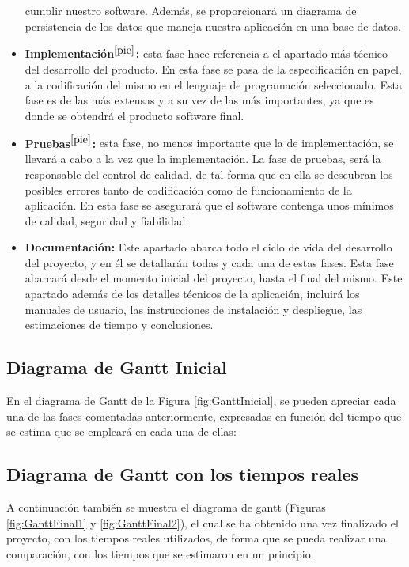 \begin{itemize}
           cumplir nuestro software. Además, se proporcionará un diagrama de
           persistencia de los datos que maneja nuestra aplicación en una base
           de datos.
    \item \textbf{Implementación$^{\ref{pie}}$: } esta fase hace referencia a
           el apartado más técnico del desarrollo del producto. En esta fase se
           pasa de la especificación en papel, a la codificación del mismo en el
           lenguaje de programación seleccionado. Esta fase es de las más
           extensas y a su vez de las más importantes, ya que es donde se
           obtendrá el producto software final.
    \item \textbf{Pruebas$^{\ref{pie}}$: } esta fase, no menos importante que
           la de implementación, se llevará a cabo a la vez que la
           implementación. La fase de pruebas, será la responsable del control
           de calidad, de tal forma que en ella se descubran los posibles
           errores tanto de codificación como de funcionamiento de la aplicación.
           En esta fase se asegurará que el software contenga unos mínimos de
           calidad, seguridad y fiabilidad.
    \item \textbf{Documentación: } Este apartado abarca todo el ciclo de vida
           del desarrollo del proyecto, y en él se detallarán todas y cada una
           de estas fases. Esta fase abarcará desde el momento inicial del
           proyecto, hasta el final del mismo. Este apartado además de los
           detalles técnicos de la aplicación, incluirá los manuales de usuario,
           las instrucciones de instalación y despliegue, las estimaciones de
           tiempo y conclusiones.
\end{itemize}

\subsection{Diagrama de Gantt Inicial}

En el diagrama de Gantt de la Figura \ref{fig:GanttInicial}, se pueden
apreciar cada una de las fases comentadas anteriormente, expresadas en función
del tiempo que se estima que se empleará en cada una de ellas:

\subsection{Diagrama de Gantt con los tiempos reales}

A continuación también se muestra el diagrama de gantt (Figuras
\ref{fig:GanttFinal1} y \ref{fig:GanttFinal2}), el cual se ha obtenido una vez
finalizado el proyecto, con los tiempos reales utilizados, de forma que se pueda
realizar una comparación, con los tiempos que se estimaron en un principio.

